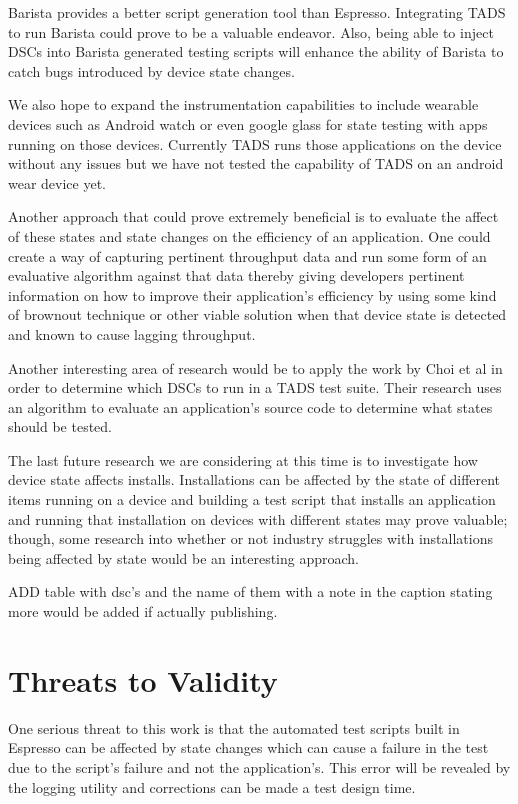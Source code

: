 Barista \cite{7927971} provides a better script generation tool than Espresso.  Integrating TADS to run Barista could prove to be a valuable endeavor.  Also, being able to inject DSCs into Barista generated testing scripts will enhance the ability of Barista to catch bugs introduced by device state changes.  

We also hope to expand the instrumentation capabilities to include wearable devices such as Android watch or even google glass for state testing with apps running on those devices.  Currently TADS runs those applications on the device without any issues but we have not tested the capability of TADS on an android wear device yet.

Another approach that could prove extremely beneficial is to evaluate the affect of these states and state changes on the efficiency of an application. One could create a way of capturing pertinent throughput data and run some form of an evaluative algorithm against that data thereby giving developers pertinent information on how to improve their application's efficiency by using some kind of brownout technique \cite{Klein:2014:BBM:2568225.2568227} or other viable solution when that device state is detected and known to cause lagging throughput. 

Another interesting area of research would be to apply the work by Choi et al \cite{Choi:2013:GGT:2544173.2509552} in order to determine which DSCs to run in a TADS test suite.  Their research uses an algorithm to evaluate an application's source code to determine what states should be tested.  

The last future research we are considering at this time is to investigate how device state affects installs.  Installations can be affected by the state of different items running on a device and building a test script that installs an application and running that installation on devices with different states may prove valuable; though, some research into whether or not industry struggles with installations being affected by state would be an interesting approach.  

ADD table with dsc's and the name of them with a note in the caption stating more would be added if actually publishing.  


\section{Threats to Validity}
One serious threat to this work is that the automated test scripts built in Espresso can be affected by state changes \cite{7927971} which can cause a failure in the test due to the script's failure and not the application's.  This error will be revealed by the logging utility and corrections can be made a test design time.  


